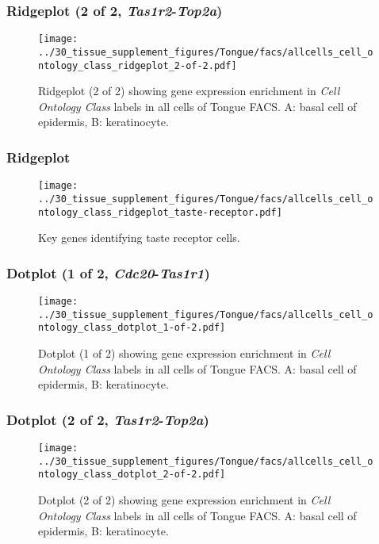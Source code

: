 \clearpage

\subsubsection{Ridgeplot (2 of 2, \emph{Tas1r2}-\emph{Top2a})}
\begin{figure}[h]
\centering
\texttt{[image: ../30\_tissue\_supplement\_figures/Tongue/facs/allcells\_cell\_ontology\_class\_ridgeplot\_2-of-2.pdf]}

\caption{ Ridgeplot (2 of 2)  showing gene expression enrichment in \emph{Cell Ontology Class} labels in all cells of Tongue FACS. A: basal cell of epidermis, B: keratinocyte.}
\end{figure}


\clearpage

\subsubsection{Ridgeplot}
\begin{figure}[h]
\centering
\texttt{[image: ../30\_tissue\_supplement\_figures/Tongue/facs/allcells\_cell\_ontology\_class\_ridgeplot\_taste-receptor.pdf]}

\caption{Key genes identifying taste receptor cells.
}
\end{figure}


\clearpage

\subsubsection{Dotplot (1 of 2, \emph{Cdc20}-\emph{Tas1r1})}
\begin{figure}[h]
\centering
\texttt{[image: ../30\_tissue\_supplement\_figures/Tongue/facs/allcells\_cell\_ontology\_class\_dotplot\_1-of-2.pdf]}

\caption{ Dotplot (1 of 2)  showing gene expression enrichment in \emph{Cell Ontology Class} labels in all cells of Tongue FACS. A: basal cell of epidermis, B: keratinocyte.}
\end{figure}


\clearpage

\subsubsection{Dotplot (2 of 2, \emph{Tas1r2}-\emph{Top2a})}
\begin{figure}[h]
\centering
\texttt{[image: ../30\_tissue\_supplement\_figures/Tongue/facs/allcells\_cell\_ontology\_class\_dotplot\_2-of-2.pdf]}

\caption{ Dotplot (2 of 2)  showing gene expression enrichment in \emph{Cell Ontology Class} labels in all cells of Tongue FACS. A: basal cell of epidermis, B: keratinocyte.}
\end{figure}



